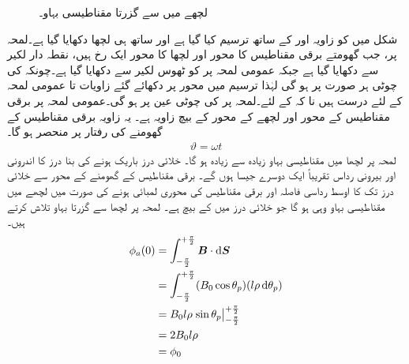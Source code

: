 \begin{figure}
%
\caption{لچھے میں سے گزرتا مقناطیسی بہاو۔}
\label{شکل_گھومتے_مشین_لچھے_سے_گزرتی_بیاو}
\end{figure}%
%
شکل   میں  کو زاویہ  اور   کے ساتھ ترسیم کیا گیا ہے اور ساتھ ہی  لچھا  دکھایا گیا ہے۔لمحہ پر، جب  گھومتے برقی مقناطیس کا محور اور لچھا  کا محور ایک رخ  ہیں،  نقطہ دار  لکیر سے  دکھایا گیا ہے جبکہ عمومی  لمحہ  پر   کو  ٹھوس لکیر سے   دکھایا گیا ہے۔چونکہ  کی چوٹی ہر صورت  پر ہو گی لہٰذا  ترسیم میں محور  پر دکھائے گئے زاویات  تا  عمومی لمحہ  کے لئے درست  ہیں نا کہ  کے لئے۔لمحہ  پر  کی چوٹی عین  پر ہو گی۔عمومی  لمحہ  پر برقی مقناطیس کے محور اور لچھے کے محور کے بیچ  زاویہ ہے۔ یہ زاویہ برقی مقناطیس کے گھومنے کی رفتار  پر منحصر ہو گا۔
\begin{align}
\vartheta=\omega t
\end{align}
لمحہ  پر لچھا  میں   مقناطیسی بہاو زیادہ سے زیادہ ہو گا۔ خلائی درز باریک ہونے کی بنا درز کا اندرونی اور بیرونی رداس تقریباً  ایک دوسرے جیسا ہوں گے۔ برقی مقناطیس کے گھومنے کے محور سے  خلائی درز تک کا اوسط رداسی فاصلہ  اور  برقی مقناطیس کی محوری لمبائی  ہونے کی صورت میں لچھے میں  مقناطیسی بہاو وہی ہو گا جو  خلائی درز میں    کے بیچ ہے۔ لمحہ  پر  لچھا  سے گزرتا بہاو  تلاش کرتے ہیں۔
\begin{gather}
\begin{aligned}\label{مساوات_گھومتے_مشین_قطب_پر_بہاو}
\phi_a(0)&=\int_{-\frac{\pi}{2}}^{+\frac{\pi}{2}} \kvec{B} \cdot \dif \kvec{S}\\
&=\int_{-\frac{\pi}{2}}^{+\frac{\pi}{2}} (B_0 \cos \theta_p)(l \rho \dif \theta_p)\\
&=B_0 l \rho \left. \sin \theta_p \right\vert_{-\frac{\pi}{2}}^{+\frac{\pi}{2}}\\
&=2 B_0 l \rho\\
&=\phi_0
\end{aligned}
\end{gather}
